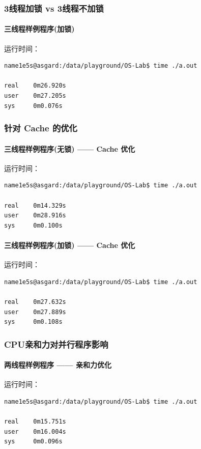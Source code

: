 \documentclass[blue,normal,cn]{elegantnote}
\begin{document}
\subsubsection{3线程加锁 vs 3线程不加锁}
\paragraph{三线程样例程序(加锁)}

运行时间：
\begin{lstlisting}
name1e5s@asgard:/data/playground/OS-Lab$ time ./a.out 

real    0m26.920s
user    0m27.205s
sys     0m0.076s
\end{lstlisting}

\subsubsection{针对 Cache 的优化}
\paragraph{三线程样例程序(无锁) —— Cache 优化}

运行时间：
\begin{lstlisting}
name1e5s@asgard:/data/playground/OS-Lab$ time ./a.out 

real    0m14.329s
user    0m28.916s
sys     0m0.100s
\end{lstlisting}
\paragraph{三线程样例程序(加锁) —— Cache 优化}

运行时间：
\begin{lstlisting}
name1e5s@asgard:/data/playground/OS-Lab$ time ./a.out 

real    0m27.632s
user    0m27.889s
sys     0m0.108s
\end{lstlisting}

\subsubsection{CPU亲和力对并行程序影响}
\paragraph{两线程样例程序 —— 亲和力优化}

运行时间：
\begin{lstlisting}
name1e5s@asgard:/data/playground/OS-Lab$ time ./a.out 

real    0m15.751s
user    0m16.004s
sys     0m0.096s
\end{lstlisting}
\end{document}
